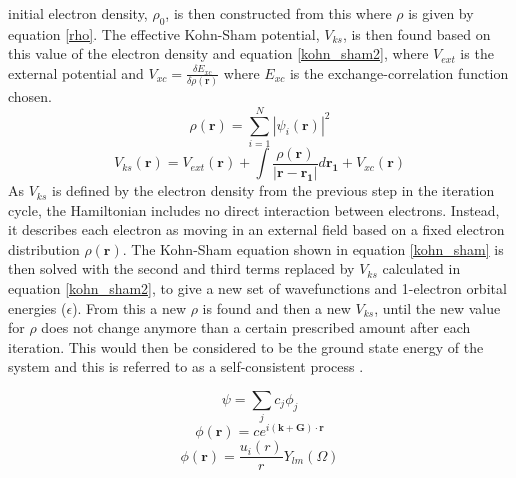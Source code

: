 initial electron density, $\rho_0$, is then constructed from this where $\rho$ is given by 
equation \ref{rho}. The effective Kohn-Sham potential, $V_{ks}$, is then found based on this value of 
the electron density and equation \ref{kohn_sham2}, where $V_{ext}$ is the external 
potential and $V_{xc} = \frac{\delta E_{xc}}{ \delta \rho(\mathbf{r})}$ where $E_{xc}$ is the 
exchange-correlation function chosen.
\begin{equation}\label{rho}
\rho(\mathbf{r}) = \sum_{i=1}^N |\psi_i(\mathbf{r})|^2
\end{equation}
\begin{equation} \label{kohn_sham2}
V_{ks}(\mathbf{r}) = V_{ext}(\mathbf{r}) + \int \frac{ \rho(\mathbf{r}) } {|\mathbf{r}-\mathbf{r_1}|} d\mathbf{r_1} + V_{xc}(\mathbf{r})
\end{equation}
As $V_{ks}$ is defined by the electron density from the previous step in the iteration cycle, the Hamiltonian includes no direct interaction between electrons. Instead, it describes each electron as moving in an external field based on a fixed electron distribution $\rho(\mathbf{r})$. The Kohn-Sham equation shown in equation \ref{kohn_sham} is then solved with the second and third terms replaced by $V_{ks}$ calculated in equation \ref{kohn_sham2}, to give a new set of wavefunctions and 1-electron orbital energies ($\epsilon$). From this a new $\rho$ is found and then a new $V_{ks}$, until the new value for $\rho$ does not change anymore than a certain prescribed amount after each iteration. This would then be considered to be the ground state energy of the system and this is referred to as a self-consistent process \cite{Lesar}.

\begin{equation}\label{basis_set}
\psi = \sum_j c_j \phi_j
\end{equation}
\begin{equation}\label{plane_wave}
\phi(\textbf{r}) = ce^{i(\textbf{k}+\textbf{G})\cdot \textbf{r}}
\end{equation}
\begin{equation}\label{NAO}
\phi(\textbf{r}) = \frac{u_i(r)}{r} Y_{lm}(\Omega)
\end{equation}

